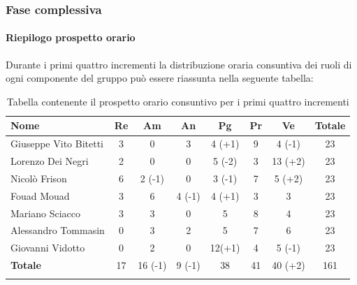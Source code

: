 		\pagebreak
		
		\subsubsection{Fase complessiva}
		
		\paragraph{Riepilogo prospetto orario}
			Durante i primi quattro incrementi la distribuzione oraria consuntiva dei ruoli di ogni componente del gruppo può essere riassunta nella seguente tabella:
			
			\begin{longtable}{|l|c|c|c|c|c|c|c|}
				\hline
				\rowcolor{lighter-grayer}
				\textbf{Nome} & \textbf{Re} & \textbf{Am} & \textbf{An} & \textbf{Pg}  & \textbf{Pr}   & \textbf{Ve} & \textbf{Totale} \\
				\hline
				\endfirsthead
				
				\hline
				Giuseppe Vito Bitetti 		 & 3 & 0 & 3 & 4 (+1) & 9 & 4 (-1) & 23\\
				\hline
				\hline
				Lorenzo Dei Negri			 & 2 & 0 & 0 & 5 (-2) & 3 & 13 (+2) & 23\\
				\hline
				\hline
				Nicolò Frison				    & 6 & 2 (-1) & 0 & 3 (-1) & 7 & 5 (+2) & 23\\
				\hline
				\hline
				Fouad Mouad 				 & 3 & 6 & 4 (-1) & 4 (+1) & 3 & 3 & 23\\
				\hline
				\hline
				Mariano Sciacco 			 & 3 & 3 & 0 & 5 & 8 & 4 & 23\\
				\hline
				\hline
				Alessandro Tommasin     & 0 & 3 & 2 & 5 & 7 & 6 & 23\\
				\hline
				\hline
				Giovanni Vidotto 			 & 0 & 2 & 0 & 12(+1) & 4 & 5 (-1) & 23\\
				\hline 
				\textbf{Totale}			 		& 17 & 16 (-1) & 9 (-1) & 38 & 41 & 40 (+2) & 161\\
				\hline
				\caption{Tabella contenente il prospetto orario consuntivo per i primi quattro incrementi}
			\end{longtable}
			

